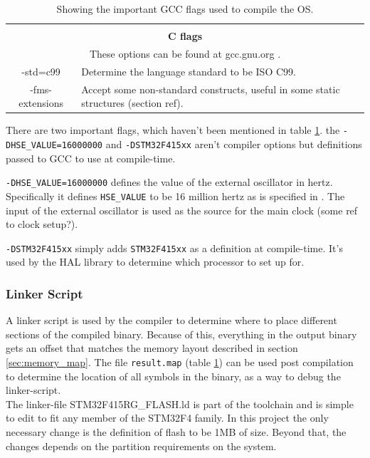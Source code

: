 \begin{table}[H]
\begin{tabular}{|c|p{10cm}|}
		\hline
		\multicolumn{2}{c}{} \\
		\multicolumn{2}{c}{\textbf{C flags}} \\
		\multicolumn{2}{c}{These options can be found at gcc.gnu.org \cite{gcc_c_dialects}.} \\
		\hline
		-std=c99 &
		Determine the language standard to be ISO C99. \\
		\hline
		-fms-extensions &
		Accept some non-standard constructs, useful in some static structures (section ref). \\
		\hline
	\end{tabular}
	\caption{Showing the important GCC flags used to compile the OS.}
	\label{tab:gcc_flags}
\end{table}

There are two important flags, which haven't been mentioned in table \ref{tab:gcc_flags}.
the \texttt{-DHSE\_VALUE=16000000} and \texttt{-DSTM32F415xx} aren't compiler options but definitions passed to GCC to use at compile-time.

\texttt{-DHSE\_VALUE=16000000} defines the value of the external oscillator in hertz.
Specifically it defines \texttt{HSE\_VALUE} to be 16 million hertz as is specified in \cite{hse_value}.
The input of the external oscillator is used as the source for the main clock (some ref to clock setup?).

\texttt{-DSTM32F415xx} simply adds \texttt{STM32F415xx} as a definition at compile-time.
It's used by the HAL library to determine which processor to set up for.

\subsubsection{Linker Script}
\label{ssec:linker_script}
A linker script is used by the compiler to determine where to place different sections of the compiled binary.
Because of this, everything in the output binary gets an offset that matches the memory layout described in section \ref{sec:memory_map}.
The file \texttt{result.map} (table \ref{tab:gcc_flags}) can be used post compilation to determine the location of all symbols in the binary,
as a way to debug the linker-script.\\

The linker-file STM32F415RG\_FLASH.ld is part of the toolchain and is simple to edit to fit any member of the STM32F4 family.
In this project the only necessary change is the definition of flash to be 1MB of size.
Beyond that, the changes depends on the partition requirements on the system.\\

